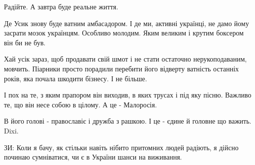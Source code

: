 Радійте. А завтра буде реальне життя. 

Де Усик знову буде ватним амбасадором. І де ми, активні українці, не дамо йому
засрати мозок українцям. Особливо молодим. Яким великим і крутим боксером він
би не був.  

Хай усік зараз, щоб продавати свій шмот і не стати остаточно нерукоподаваним,
мовчить. Піарники просто порадили перебити його відверту ватність останніх
років, яка почала шкодити бізнесу. І не більше.

І пох на те, з яким прапором він виходив, в яких трусах і під яку пісню.
Важливо те, що він несе собою в цілому. А це - Малоросія.

В його голові - православіє і дружба з рашкою. І це - єдине й головне що
важить. Dixi.

ЗИ: Коли я бачу, як стільки навіть нібито притомних людей радіють, я дійсно
починаю сумніватися, чи є в України шанси на виживання.

